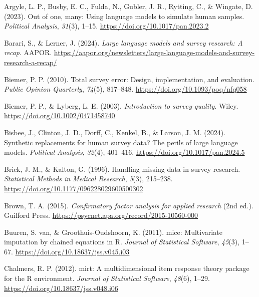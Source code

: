 \documentclass[
  man,
  floatsintext,
  longtable,
  nolmodern,
  notxfonts,
  notimes,
  colorlinks=true,linkcolor=blue,citecolor=blue,urlcolor=blue]{apa7}
\newlength{\cslhangindent}
\newenvironment{CSLReferences}[2] %
 {\begin{list}{}{%
  \setlength{\itemindent}{0pt}
  \setlength{\leftmargin}{0pt}
  \setlength{\parsep}{0pt}
  \ifodd #1
   \setlength{\leftmargin}{\cslhangindent}
   \setlength{\itemindent}{-1\cslhangindent}
  \fi
  \setlength{\itemsep}{#2\baselineskip}}}
 {\end{list}}
\begin{document}
\label{refs}
\begin{CSLReferences}{1}{0}
Argyle, L. P., Busby, E. C., Fulda, N., Gubler, J. R., Rytting, C., \&
Wingate, D. (2023). Out of one, many: Using language models to simulate
human samples. \emph{Political Analysis}, \emph{31}(3), 1--15.
\url{https://doi.org/10.1017/pan.2023.2}

Barari, S., \& Lerner, J. (2024). \emph{Large language models and survey
research: A recap}. AAPOR.
\url{https://aapor.org/newsletters/large-language-models-and-survey-research-a-recap/}

Biemer, P. P. (2010). Total survey error: Design, implementation, and
evaluation. \emph{Public Opinion Quarterly}, \emph{74}(5), 817--848.
\url{https://doi.org/10.1093/poq/nfq058}

Biemer, P. P., \& Lyberg, L. E. (2003). \emph{Introduction to survey
quality}. Wiley. \url{https://doi.org/10.1002/0471458740}

Bisbee, J., Clinton, J. D., Dorff, C., Kenkel, B., \& Larson, J. M.
(2024). Synthetic replacements for human survey data? {The} perils of
large language models. \emph{Political Analysis}, \emph{32}(4),
401--416. \url{https://doi.org/10.1017/pan.2024.5}

Brick, J. M., \& Kalton, G. (1996). Handling missing data in survey
research. \emph{Statistical Methods in Medical Research}, \emph{5}(3),
215--238. \url{https://doi.org/10.1177/096228029600500302}

Brown, T. A. (2015). \emph{Confirmatory factor analysis for applied
research} (2nd ed.). Guilford Press.
\url{https://psycnet.apa.org/record/2015-10560-000}

Buuren, S. van, \& Groothuis-Oudshoorn, K. (2011). {mice}: Multivariate
imputation by chained equations in {R}. \emph{Journal of Statistical
Software}, \emph{45}(3), 1--67.
\url{https://doi.org/10.18637/jss.v045.i03}

Chalmers, R. P. (2012). {mirt}: A multidimensional item response theory
package for the {R} environment. \emph{Journal of Statistical Software},
\emph{48}(6), 1--29. \url{https://doi.org/10.18637/jss.v048.i06}


\end{CSLReferences}
\end{document}
